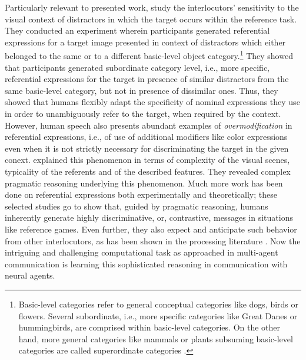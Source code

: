 Particularly relevant to presented work, \cite{graf2016animal} study the interlocutors' sensitivity to the visual context of distractors in which the target occurs within the reference task. They conducted an experiment wherein participants generated referential expressions for a target image presented in context of distractors which either belonged to the same or to a different basic-level object category.\footnote{Basic-level categories refer to general conceptual categories like dogs, birds or flowers. Several subordinate, i.e., more specific categories like Great Danes or hummingbirds, are comprised within basic-level categories. On the other hand, more general categories like mammals or plants subsuming basic-level categories are called superordinate categories \parencite{rosch1976basic}.} They showed that participants generated subordinate category level, i.e., more specific, referential expressions for the target in presence of similar distractors from the same basic-level category, but not in presence of dissimilar ones. Thus, they showed that humans flexibly adapt the specificity of nominal expressions they use in order to unambiguously refer to the target, when required by the context. However, human speech also presents abundant examples of \textit{overmodification} in referential expressions, i.e., of use of additional modifiers like color expressions even when it is not strictly necessary for discriminating the target in the given conext. \cite{degen2020redundancy} explained this phenomenon in terms of complexity of the visual scenes, typicality of the referents and of the described features. They revealed complex pragmatic reasoning underlying this phenomenon. Much more work has been done on referential expressions both experimentally and theoretically; these selected studies go to show that, guided by pragmatic reasoning, humans inherently generate highly discriminative, or, contrastive, messages in situations like reference games. Even further, they also expect and anticipate such behavior from other interlocutors, as has been shown in the processing literature \parencite[e.~g.,~cf.][]{sedivy1999achieving}. Now the intriguing and challenging computational task as approached in multi-agent communication is learning this sophisticated reasoning in communication with neural agents.



